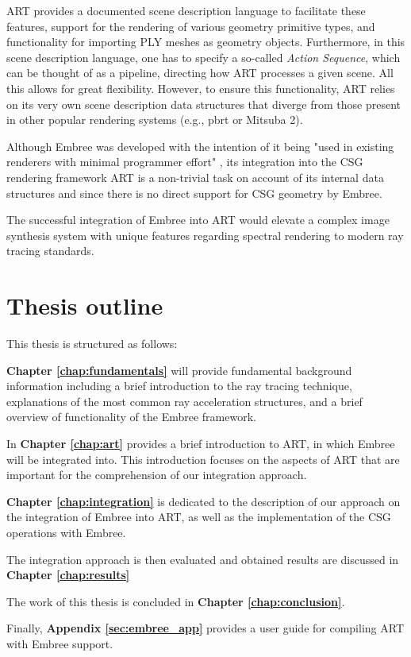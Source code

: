 ART provides a documented scene description language to facilitate these features, support for the rendering of various geometry primitive types, and functionality for importing PLY meshes as geometry objects. Furthermore, in this scene description language, one has to specify a so-called \emph{Action Sequence}, which can be thought of as a pipeline, directing how ART processes a given scene.
All this allows for great flexibility. However, to ensure this functionality, ART relies on its very own scene description data structures that diverge from those present in other popular rendering systems (e.g., pbrt \cite{pharr2016physically} or Mitsuba 2).


Although Embree was developed with the intention of it being "used in existing renderers with minimal programmer effort" \cite[1]{wald2014embree}, its integration into the CSG rendering framework ART is a non-trivial task on account of its internal data structures and since there is no direct support for CSG geometry by Embree.

The successful integration of Embree into ART would elevate a complex image synthesis system with unique features regarding spectral rendering to modern ray tracing standards. 

\section*{Thesis outline}

This thesis is structured as follows: 

\textbf{Chapter \ref{chap:fundamentals}} will provide fundamental background information including a brief introduction to the ray tracing technique, explanations of the most common ray acceleration structures, and a brief overview of functionality of the Embree framework.

In \textbf{Chapter \ref{chap:art}} provides a brief introduction to ART, in which Embree will be integrated into. This introduction focuses on the aspects of ART that are important for the comprehension of our integration approach.

\textbf{Chapter \ref{chap:integration}} is dedicated to the description of our approach on the integration of Embree into ART, as well as the implementation of the CSG operations with Embree.

The integration approach is then evaluated and obtained results are discussed in \textbf{Chapter \ref{chap:results}}  

The work of this thesis is concluded in \textbf{Chapter \ref{chap:conclusion}}.

Finally, \textbf{Appendix \ref{sec:embree_app}} provides a user guide for compiling ART with Embree support.